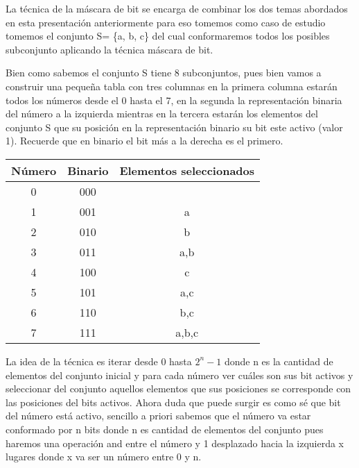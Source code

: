 La técnica de la máscara de bit se encarga de combinar los dos temas abordados en esta presentación anteriormente para eso tomemos como caso de estudio tomemos el conjunto S= \{a, b, c\} del cual conformaremos todos los posibles subconjunto aplicando la técnica máscara de bit.

Bien como sabemos el conjunto S tiene 8 subconjuntos, pues bien vamos a construir una pequeña tabla con tres columnas en la primera columna estarán todos los números desde el 0 hasta el 7, en la segunda la representación binaria del número a la izquierda mientras en la tercera estarán los elementos del conjunto S que su posición en la representación binario su bit este activo (valor 1). Recuerde que en binario el bit más a la derecha es el primero.
\begin{table}[h]
	\begin{center}
		\begin{tabular}{|c|c|c|}
			\hline
			\textbf{Número } & \textbf{Binario } & \textbf{Elementos seleccionados} \\ \hline 
			0 &  000&  \\ \hline 
			1 &  001&  a\\ \hline 
			2 &  010&  b\\ \hline 
			3 &  011&  a,b\\ \hline 
			4 &  100&  c\\ \hline 
			5 &  101&  a,c\\ \hline 
			6 &  110&  b,c\\ \hline 
			7 &  111&  a,b,c\\ \hline
		\end{tabular}
	\end{center}
\end{table}

La idea de la técnica es iterar desde 0 hasta $ 2^{ n }-1 $ donde n es la cantidad de elementos del conjunto inicial y para cada número ver cuáles son sus bit activos y seleccionar del conjunto aquellos elementos que sus posiciones se corresponde con las posiciones del bits activos. Ahora duda que puede surgir es como sé que bit del número está activo, sencillo a priori sabemos que el número va estar conformado por n bits donde n es cantidad de elementos del conjunto pues haremos una operación and entre el número y 1 desplazado hacia la izquierda x lugares donde x va ser un número entre 0 y n.